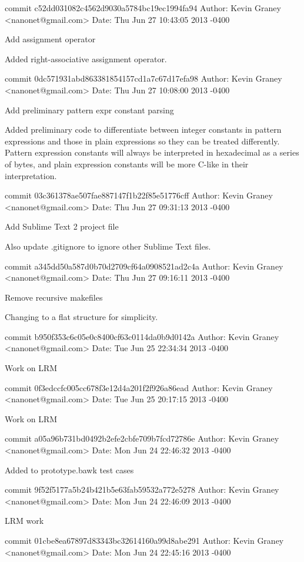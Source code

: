 commit c52dd031082c4562d9030a5784bc19ec1994fa94
Author: Kevin Graney <nanonet@gmail.com>
Date:   Thu Jun 27 10:43:05 2013 -0400

    Add assignment operator
    
    Added right-associative assignment operator.

commit 0dc571931abd863381854157cd1a7c67d17efa98
Author: Kevin Graney <nanonet@gmail.com>
Date:   Thu Jun 27 10:08:00 2013 -0400

    Add preliminary pattern expr constant parsing
    
    Added preliminary code to differentiate between integer constants
    in pattern expressions and those in plain expressions so they can
    be treated differently.  Pattern expression constants will always
    be interpreted in hexadecimal as a series of bytes, and plain
    expression constants will be more C-like in their interpretation.

commit 03c361378ae507fae887147f1b22f85e51776cff
Author: Kevin Graney <nanonet@gmail.com>
Date:   Thu Jun 27 09:31:13 2013 -0400

    Add Sublime Text 2 project file
    
    Also update .gitignore to ignore other Sublime Text files.

commit a345dd50a587d0b70d2709cf64a0908521ad2c4a
Author: Kevin Graney <nanonet@gmail.com>
Date:   Thu Jun 27 09:16:11 2013 -0400

    Remove recursive makefiles
    
    Changing to a flat structure for simplicity.

commit b950f353c6c05e0c8400cf63c0114da0b9d0142a
Author: Kevin Graney <nanonet@gmail.com>
Date:   Tue Jun 25 22:34:34 2013 -0400

    Work on LRM

commit 0f3edccfc005cc678f3e12d4a201f2f926a86ead
Author: Kevin Graney <nanonet@gmail.com>
Date:   Tue Jun 25 20:17:15 2013 -0400

    Work on LRM

commit a05a96b731bd0492b2efe2cbfe709b7fcd72786e
Author: Kevin Graney <nanonet@gmail.com>
Date:   Mon Jun 24 22:46:32 2013 -0400

    Added to prototype.bawk test cases

commit 9f52f5177a5b24b421b5e63fab59532a772e5278
Author: Kevin Graney <nanonet@gmail.com>
Date:   Mon Jun 24 22:46:09 2013 -0400

    LRM work

commit 01cbe8ea67897d83343bc32614160a99d8abe291
Author: Kevin Graney <nanonet@gmail.com>
Date:   Mon Jun 24 22:45:16 2013 -0400

